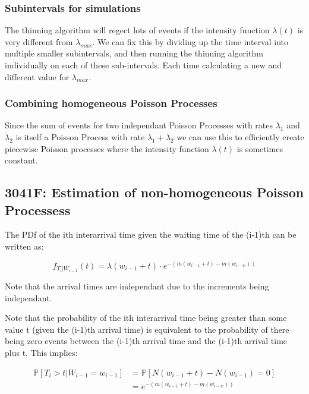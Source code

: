     \subsubsection{Subintervals for simulations}
    The thinning algorithm will regect lots of events if the intensity function \(\lambda(t)\) 
    is very different from \(\lambda_{max}\). We can fix this by dividing up the time interval
    into multiple smaller subintervals, and then running the thinning algorithm individually on
    each of these sub-intervals. Each time calculating a new and different value for 
    \(\lambda_{max}\).
    \subsubsection{Combining homogeneous Poisson Processes}
    Since the sum of events for two independant Poisson Processes with rates 
    \(\lambda_1\) and \(\lambda_2\) is itself a Poisson Process with rate \(\lambda_1 + \lambda_2\)
    we can use this to efficiently create piecewise Poisson processes where the 
    intensity function \(\lambda(t)\) is sometimes constant.
    \subsection{3041F: Estimation of non-homogeneous Poisson Processess}
    The PDf of the ith interarrival time given the waiting time of the (i-1)th can be written as:

    \begin{equation*}
        f_{T_i | W_{i-1}}(t) = 
        \lambda(w_{i-1} + t) \cdot e^{-\left(m(w_{i-1} + t) - m(w_{i-w})\right)}
    \end{equation*}

    Note that the arrival times are independant due to the increments being independant. \newline \newline

    Note that the probability of the ith interarrival time being greater than some value t (given 
    the (i-1)th arrival time) is equivalent to the probability of there being zero events between 
    the (i-1)th arrival time and the (i-1)th arrival time plus t. This implies:

    \begin{equation*}
        \begin{aligned}
            \mathbb{P}[T_i > t | W_{i-1} = w_{i-1}] &= \mathbb{P}[N(w_{i-1} + t) - N(w_{i-1}) = 0] \\
                                                    &=  e^{-\left(m(w_{i-1} + t) - m(w_{i-w})\right)} \\
        \end{aligned}
    \end{equation*}
